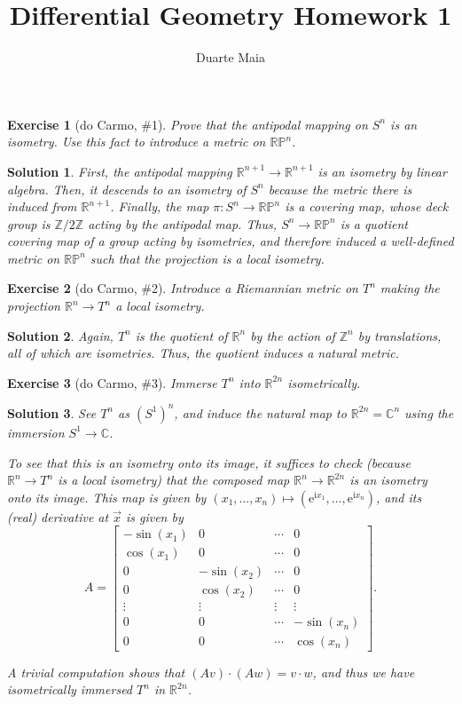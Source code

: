 \documentclass{article}
\title{Differential Geometry Homework 1}
\author{Duarte Maia}
\theoremstyle{plain}
\newtheorem*{ex}{Exercise}
\theoremstyle{nonumberplain}
\newtheorem{sol}{Solution}
\newcommand{\R}{\mathbb{R}}
\newcommand{\C}{\mathbb{C}}
\newcommand{\Z}{\mathbb{Z}}
\newcommand{\PP}{\mathbb{P}}
\newcommand{\I}{\mathrm{i}}
\newcommand{\e}{\mathrm{e}}
\begin{document}
\maketitle

\begin{ex}[do Carmo, \#1]
Prove that the antipodal mapping on $S^n$ is an isometry. Use this fact to introduce a metric on $\R \PP^n$.
\end{ex}

\begin{sol}
First, the antipodal mapping $\R^{n+1} \to \R^{n+1}$ is an isometry by linear algebra. Then, it descends to an isometry of $S^n$ because the metric there is induced from $\R^{n+1}$. Finally, the map $\pi \colon S^n \to \R \PP^n$ is a covering map, whose deck group is $\Z/2\Z$ acting by the antipodal map. Thus, $S^n \to \R\PP^n$ is a quotient covering map of a group acting by isometries, and therefore induced a well-defined metric on $\R\PP^n$ such that the projection is a local isometry.
\end{sol}

\begin{ex}[do Carmo, \#2]
Introduce a Riemannian metric on $T^n$ making the projection $\R^n \to T^n$ a local isometry.
\end{ex}

\begin{sol}
Again, $T^n$ is the quotient of $\R^n$ by the action of $\Z^n$ by translations, all of which are isometries. Thus, the quotient induces a natural metric.
\end{sol}

\begin{ex}[do Carmo, \#3]
Immerse $T^n$ into $\R^{2n}$ isometrically.
\end{ex}

\begin{sol}
See $T^n$ as $(S^1)^n$, and induce the natural map to $\R^{2n} = \C^n$ using the immersion $S^1 \to \C$.

To see that this is an isometry onto its image, it suffices to check (because $\R^n \to T^n$ is a local isometry) that the composed map $\R^n \to \R^{2n}$ is an isometry onto its image. This map is given by $(x_1, \dots, x_n) \mapsto (\e^{\I x_1}, \dots, \e^{\I x_n})$, and its (real) derivative at $\vec x$ is given by
\begin{equation}
A = 
\begin{bmatrix}
-\sin(x_1) & 0 & \cdots & 0\\
\cos(x_1) & 0 & \cdots & 0\\
0 & -\sin(x_2) & \cdots & 0\\
0 & \cos(x_2) & \cdots & 0\\
\vdots & \vdots & \vdots & \vdots\\
0 & 0 & \cdots & -\sin(x_n)\\
0 & 0 & \cdots & \cos(x_n)
\end{bmatrix}.
\end{equation}

A trivial computation shows that $(Av) \cdot (Aw) = v \cdot w$, and thus we have isometrically immersed $T^n$ in $\R^{2n}$.
\end{sol}
\end{document}
